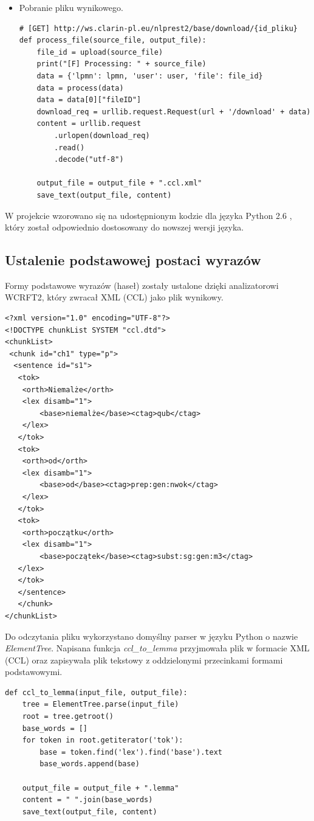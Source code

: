 \begin{itemize}
\item Pobranie pliku wynikowego.
\begin{lstlisting}[style=pythonStyle]
# [GET] http://ws.clarin-pl.eu/nlprest2/base/download/{id_pliku}
def process_file(source_file, output_file):
    file_id = upload(source_file)
    print("[F] Processing: " + source_file)
    data = {'lpmn': lpmn, 'user': user, 'file': file_id}
    data = process(data)
    data = data[0]["fileID"]
    download_req = urllib.request.Request(url + '/download' + data)
    content = urllib.request
        .urlopen(download_req)
        .read()
        .decode("utf-8")

    output_file = output_file + ".ccl.xml"
    save_text(output_file, content)
\end{lstlisting}
\end{itemize}

W projekcie wzorowano się na udostępnionym kodzie dla języka Python 2.6 \cite{wcrf-api-reference}, który został odpowiednio dostosowany do nowszej wersji języka.



\subsection{Ustalenie podstawowej postaci wyrazów}
Formy podstawowe wyrazów (haseł) zostały ustalone dzięki analizatorowi WCRFT2, który zwracał XML (CCL) jako plik wynikowy. \cite{cclFormat}

\lstset{language=XML}
\begin{lstlisting}
<?xml version="1.0" encoding="UTF-8"?>
<!DOCTYPE chunkList SYSTEM "ccl.dtd">
<chunkList>
 <chunk id="ch1" type="p">
  <sentence id="s1">
   <tok>
    <orth>Niemalże</orth>
    <lex disamb="1">
    	<base>niemalże</base><ctag>qub</ctag>
    </lex>
   </tok>
   <tok>
    <orth>od</orth>
    <lex disamb="1">
    	<base>od</base><ctag>prep:gen:nwok</ctag>
    </lex>
   </tok>
   <tok>
    <orth>początku</orth>
    <lex disamb="1">
    	<base>początek</base><ctag>subst:sg:gen:m3</ctag>
   </lex>
   </tok>
   </sentence>
   </chunk>
</chunkList>
\end{lstlisting}

 Do odczytania pliku wykorzystano domyślny parser w języku Python o nazwie \textit{ElementTree}. Napisana funkcja \textit{ccl\_to\_lemma} przyjmowała plik w formacie XML (CCL) oraz zapisywała plik tekstowy z oddzielonymi przecinkami formami podstawowymi.
 

 
\begin{lstlisting}[style=pythonStyle]
def ccl_to_lemma(input_file, output_file):
    tree = ElementTree.parse(input_file)
    root = tree.getroot()
    base_words = []
    for token in root.getiterator('tok'):
        base = token.find('lex').find('base').text
        base_words.append(base)

    output_file = output_file + ".lemma"
    content = " ".join(base_words)
    save_text(output_file, content)
\end{lstlisting}



